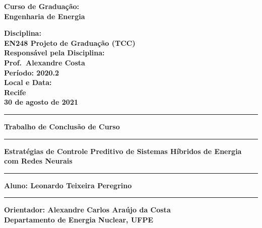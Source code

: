 \begin{titlepage}
\begin{minipage}{0.55\textwidth}
	\begin{flushleft}
		\textbf{Curso de Graduação:}\\
		\textbf{Engenharia de Energia}
	\end{flushleft}
\end{minipage}
\vrule
\begin{minipage}{0.45\textwidth}
	\bigskip
	\begin{flushright}
		\textbf{Disciplina:} \\
		\textbf{EN248 Projeto de Graduação (TCC)} \\
		\textbf{Responsável pela Disciplina:} \\
		\textbf{Prof.\ Alexandre Costa} \\
		\textbf{Período: 2020.2} \\
		\textbf{Local e Data:} \\
		\textbf{Recife} \\
		\textbf{30 de agosto de 2021}
	\end{flushright}
	\smallskip
\end{minipage}

\hrule
\smallskip
\begin{center}
	\textbf{\large Trabalho de Conclusão de Curso}
\end{center}
\smallskip
\hrule

\vfill
\begin{center}
	\begin{minipage}{0.8\textwidth}
		\centering
		\doublespacing
		\textbf{\large Estratégias de Controle Preditivo de Sistemas Híbridos de Energia com Redes Neurais}
	\end{minipage}
	\vfill
	\begin{minipage}{0.8\textwidth}
		\centering \hrule \bigskip
		\textbf{Aluno: Leonardo Teixeira Peregrino} \\
	\end{minipage}
	\vfill
	\begin{minipage}{0.8\textwidth}
		\centering \hrule \bigskip
		\textbf{Orientador: Alexandre Carlos Araújo da Costa} \\
		\textbf{Departamento de Energia Nuclear, UFPE}
	\end{minipage}
\end{center}
\vfill

\end{titlepage}
